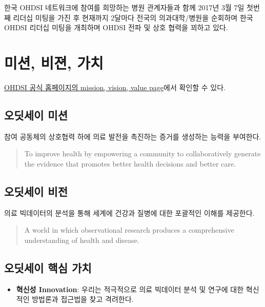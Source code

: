 \documentclass[]{book}
\providecommand{\tightlist}{%
  \setlength{\itemsep}{0pt}\setlength{\parskip}{0pt}}
\begin{document}
한국 OHDSI 네트워크에 참여를 희망하는 병원 관계자들과 함께 2017년 3월 7일 첫번째 리더십 미팅을 가진 후 현재까지 2달마다 전국의 의과대학/병원을 순회하며 한국 OHDSI 리더십 미팅을 개최하며 OHDSI 전파 및 상호 협력을 꾀하고 있다.

\hypertarget{MissionVissionValues}{%
\section{미션, 비젼, 가치}\label{MissionVissionValues}}

\href{https://www.ohdsi.org/who-we-are/mission-vision-values/}{OHDSI 공식 홈페이지의 mission, vision, value page}에서 확인할 수 있다.

\hypertarget{section}{%
\subsection{오딧세이 미션}\label{section}}

참여 공동체의 상호협력 하에 의료 발전을 촉진하는 증거를 생성하는 능력을 부여한다.

\begin{quote}
To improve health by empowering a community to collaboratively generate the evidence that promotes better health decisions and better care.
\end{quote}

\hypertarget{section-1}{%
\subsection{오딧세이 비전}\label{section-1}}

의료 빅데이터의 분석을 통해 세계에 건강과 질병에 대한 포괄적인 이해를 제공한다.

\begin{quote}
A world in which observational research produces a comprehensive understanding of health and disease.
\end{quote}

\hypertarget{section-2}{%
\subsection{오딧세이 핵심 가치}\label{section-2}}

\begin{itemize}
\tightlist
\item
  \textbf{혁신성 Innovation}: 우리는 적극적으로 의료 빅데이터 분석 및 연구에 대한 혁신적인 방법론과 접근법을 찾고 격려한다.
\end{itemize}
\end{document}
